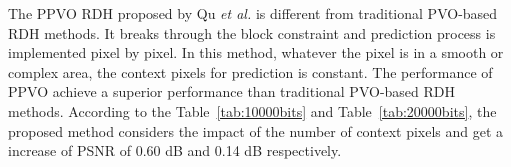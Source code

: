 \documentclass[review,3p,10pt,sort&compress]{elsarticle}
\begin{document}
The PPVO RDH proposed by Qu \emph{et al.} \cite{Qu2015PPVO} is different from traditional PVO-based RDH methods. It breaks through the block constraint and prediction process is implemented pixel by pixel. In this method, whatever the pixel is in a smooth or complex area, the context pixels for prediction is constant. The performance of PPVO achieve a superior performance than traditional PVO-based RDH methods. According to the Table~\ref{tab:10000bits} and Table~\ref{tab:20000bits}, the proposed method considers the impact of the number of context pixels and get a increase of PSNR of 0.60 dB and 0.14 dB respectively.

\begin{figure}
\centering
{}
\end{figure}
\end{document}

